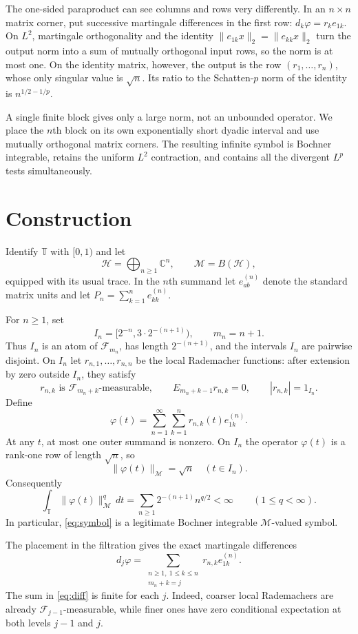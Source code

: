 \documentclass[11pt]{article}
\newcommand{\T}{\mathbb T}
\newcommand{\M}{\mathcal M}
\newcommand{\F}{\mathcal F}
\begin{document}
The one-sided paraproduct can see columns and rows very differently.  In an
$n\times n$ matrix corner, put successive martingale differences in the
first row: $d_k\varphi=r_k e_{1k}$.  On $L^2$, martingale orthogonality and
the identity $\|e_{1k}x\|_2=\|e_{kk}x\|_2$ turn the output norm into a sum
of mutually orthogonal input rows, so the norm is at most one.  On the
identity matrix, however, the output is the row
$(r_1,\ldots,r_n)$, whose only singular value is $\sqrt n$.  Its ratio to
the Schatten-$p$ norm of the identity is $n^{1/2-1/p}$.

A single finite block gives only a large norm, not an unbounded operator.
We place the $n$th block on its own exponentially short dyadic interval and
use mutually orthogonal matrix corners.  The resulting infinite symbol is
Bochner integrable, retains the uniform $L^2$ contraction, and contains all
the divergent $L^p$ tests simultaneously.

\section{Construction}

Identify $\T$ with $[0,1)$ and let
\[
 \mathcal H=\bigoplus_{n\geq1}\mathbb C^n,
 \qquad \M=B(\mathcal H),
\]
equipped with its usual trace.  In the $n$th summand let
$e_{ab}^{(n)}$ denote the standard matrix units and let
$P_n=\sum_{k=1}^n e_{kk}^{(n)}$.

For $n\geq1$, set
\[
 I_n=[2^{-n},3\cdot2^{-(n+1)}),\qquad m_n=n+1.
\]
Thus $I_n$ is an atom of $\F_{m_n}$, has length $2^{-(n+1)}$, and the
intervals $I_n$ are pairwise disjoint.  On $I_n$ let
$r_{n,1},\ldots,r_{n,n}$ be the local Rademacher functions: after extension
by zero outside $I_n$, they satisfy
\[
 r_{n,k}\text{ is }\F_{m_n+k}\text{-measurable},\qquad
 E_{m_n+k-1}r_{n,k}=0,\qquad |r_{n,k}|=1_{I_n}.
\]
Define
\begin{equation}\label{eq:symbol}
 \varphi(t)=\sum_{n=1}^{\infty}\sum_{k=1}^n
 r_{n,k}(t)e_{1k}^{(n)}.
\end{equation}
At any $t$, at most one outer summand is nonzero.  On $I_n$ the operator
$\varphi(t)$ is a rank-one row of length $\sqrt n$, so
\[
 \|\varphi(t)\|_{\M}=\sqrt n\quad(t\in I_n).
\]
Consequently
\[
 \int_\T\|\varphi(t)\|_{\M}^q\,dt
 =\sum_{n\geq1}2^{-(n+1)}n^{q/2}<\infty
 \qquad(1\leq q<\infty).
\]
In particular, \eqref{eq:symbol} is a legitimate Bochner integrable
$\M$-valued symbol.

The placement in the filtration gives the exact martingale differences
\begin{equation}\label{eq:diff}
 d_j\varphi
 =\sum_{\substack{n\geq1,\ 1\leq k\leq n\\m_n+k=j}}
 r_{n,k}e_{1k}^{(n)}.
\end{equation}
The sum in \eqref{eq:diff} is finite for each $j$.  Indeed, coarser local
Rademachers are already $\F_{j-1}$-measurable, while finer ones have zero
conditional expectation at both levels $j-1$ and $j$.
\end{document}
